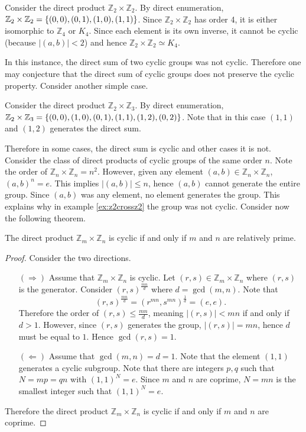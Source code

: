 \documentclass[../notes.tex]{subfiles}
\begin{document}
\begin{example}
	\label{ex:z2crossz2}
	Consider the direct product $\mathbb{Z}_2 \times \mathbb{Z}_2$. By direct enumeration, $\mathbb{Z}_2 \times \mathbb{Z}_2 = \qty{(0,0), (0,1), (1,0), (1,1)}$. Since $\mathbb{Z}_2 \times \mathbb{Z}_2$ has order 4, it is either isomorphic to $\mathbb{Z}_4$ or $K_4$. Since each element is its own inverse, it cannot be cyclic (because $|(a,b)| < 2$) and hence $\mathbb{Z}_2 \times \mathbb{Z}_2 \simeq K_4$.
\end{example}
In this instance, the direct sum of two cyclic groups was not cyclic. Therefore one may conjecture that the direct sum of cyclic groups does not preserve the cyclic property. Consider another simple case.
\begin{example}
	Consider the direct product $\mathbb{Z}_2 \times \mathbb{Z}_3$. By direct enumeration, $\mathbb{Z}_2 \times \mathbb{Z}_3 = \qty{(0,0),(1,0),(0,1),(1,1),(1,2),(0,2)}$. Note that in this case $(1,1)$ and $(1,2)$ generates the direct sum.
\end{example}
Therefore in some cases, the direct sum is cyclic and other cases it is not. Consider the class of direct products of cyclic groups of the same order $n$. Note the order of $\mathbb{Z}_n \times \mathbb{Z}_n = n^2$. However, given any element $(a,b) \in \mathbb{Z}_n \times \mathbb{Z}_n$, $(a,b)^n = e$. This implies $|(a,b)| \leq n$, hence $(a,b)$ cannot generate the entire group. Since $(a,b)$ was any element, no element generates the group. This explains why in example \ref{ex:z2crossz2} the group was not cyclic. Consider now the following theorem.

\begin{theorem}
	The direct product $\mathbb{Z}_m \times \mathbb{Z}_n$ is cyclic if and only if $m$ and $n$ are relatively prime.
\end{theorem}
\begin{proof}
	Consider the two directions.
	\begin{enumerate}
		\item[$(\Rightarrow)$]
		Assume that $\mathbb{Z}_m \times \mathbb{Z}_n$ is cyclic. Let $(r,s) \in \mathbb{Z}_m \times \mathbb{Z}_n$ where $(r,s)$ is the generator. Consider $(r,s)^{\frac{mn}{d}}$ where $d = \gcd(m,n)$. Note that
			\[
				(r,s)^{\frac{mn}{d}} = (r^{mn}, s^{mn})^{\frac{1}{d}} = (e,e)
			.\]
			Therefore the order of $(r,s) \leq \frac{mn}{d}$, meaning $|(r,s)| < mn$ if and only if $d>1$. However, since $(r,s)$ generates the group, $|(r,s)| = mn$, hence $d$ must be equal to $1$. Hence $\gcd(r,s) = 1$.
		\item[$(\Leftarrow)$]
		Assume that $\gcd(m,n) = d = 1$. Note that the element $(1,1)$ generates a cyclic subgroup. Note that there are integers $p,q$ such that $N = mp = qn$ with $(1,1)^N = e$. Since $m$ and $n$ are coprime, $N = mn$ is the smallest integer such that $(1,1)^N = e$.
	\end{enumerate}
	Therefore the direct product $\mathbb{Z}_m \times \mathbb{Z}_n$ is cyclic if and only if $m$ and $n$ are coprime.
\end{proof}
\end{document}
